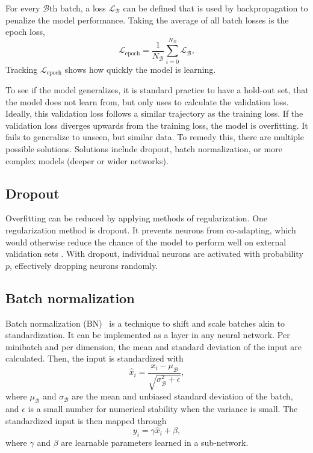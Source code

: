 For every $\mathcal{B}$th batch, a loss $\mathcal{L}_\mathcal{B}$ can be defined that is used by backpropagation to penalize the model performance.
Taking the average of all batch losses is the epoch loss,
\begin{equation}
    \mathcal{L}_\mathrm{epoch} = \frac{1}{N_\mathcal{B}}\sum_{i=0}^{N_\mathcal{B}}\mathcal{L}_\mathcal{B},
\end{equation}
Tracking $\mathcal{L}_\mathrm{epoch}$ shows how quickly the model is learning.

To see if the model generalizes, it is standard practice to have a hold-out set, that the model does not learn from, but only uses to calculate the validation loss.
Ideally, this validation loss follows a similar trajectory as the training loss.
If the validation loss diverges upwards from the training loss, the model is overfitting.
It fails to generalize to unseen, but similar data.
To remedy this, there are multiple possible solutions.
Solutions include dropout, batch normalization, or more complex models (\ie deeper or wider networks).

\subsection{Dropout}\label{sec:dropout}
Overfitting can be reduced by applying methods of regularization.
One regularization method is dropout.
It prevents neurons from co-adapting, which would otherwise reduce the chance of the model to perform well on external validation sets \cite{Srivastava2014}.
With dropout, individual neurons are activated with probability $p$, effectively dropping neurons randomly.

\subsection{Batch normalization}\label{sec:bn}
Batch normalization (BN)~\cite{Ioffe2015} is a technique to shift and scale batches akin to standardization.
It can be implemented as a layer in any neural network.
Per minibatch and per dimension, the mean and standard deviation of the input are calculated.
Then, the input is standardized with
\begin{equation}
    \hat{x}_i = \frac{x_i - \mu_\mathcal{B}}{\sqrt{\sigma_\mathcal{B}^2 + \epsilon}},
\end{equation}
where $\mu_\mathcal{B}$ and $\sigma_\mathcal{B}$ are the mean and unbiased standard deviation of the batch, and $\epsilon$ is a small number for numerical stability when the variance is small.
The standardized input is then mapped through
\begin{equation}
    y_i = \gamma \hat{x}_i + \beta,
\end{equation}
where $\gamma$ and $\beta$ are learnable parameters learned in a sub-network.

